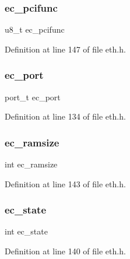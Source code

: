 \subsubsection{\texorpdfstring{ec\+\_\+pcifunc}{ec\_pcifunc}}
{\footnotesize\ttfamily u8\+\_\+t ec\+\_\+pcifunc}



Definition at line 147 of file eth.\+h.

\hypertarget{structeth__card_a640f91748f3db96c4445ddc3ec0a60e2}{}\label{structeth__card_a640f91748f3db96c4445ddc3ec0a60e2} 
\subsubsection{\texorpdfstring{ec\+\_\+port}{ec\_port}}
{\footnotesize\ttfamily port\+\_\+t ec\+\_\+port}



Definition at line 134 of file eth.\+h.

\hypertarget{structeth__card_af026fee192bff1a9d3c08b9bae5753da}{}\label{structeth__card_af026fee192bff1a9d3c08b9bae5753da} 
\subsubsection{\texorpdfstring{ec\+\_\+ramsize}{ec\_ramsize}}
{\footnotesize\ttfamily int ec\+\_\+ramsize}



Definition at line 143 of file eth.\+h.

\hypertarget{structeth__card_a227ab41e0bca9197ff22eca88f17e610}{}\label{structeth__card_a227ab41e0bca9197ff22eca88f17e610} 
\subsubsection{\texorpdfstring{ec\+\_\+state}{ec\_state}}
{\footnotesize\ttfamily int ec\+\_\+state}



Definition at line 140 of file eth.\+h.

\hypertarget{structeth__card_a83f889144d1e43c0cd130bc51f14350b}{}\label{structeth__card_a83f889144d1e43c0cd130bc51f14350b} 
